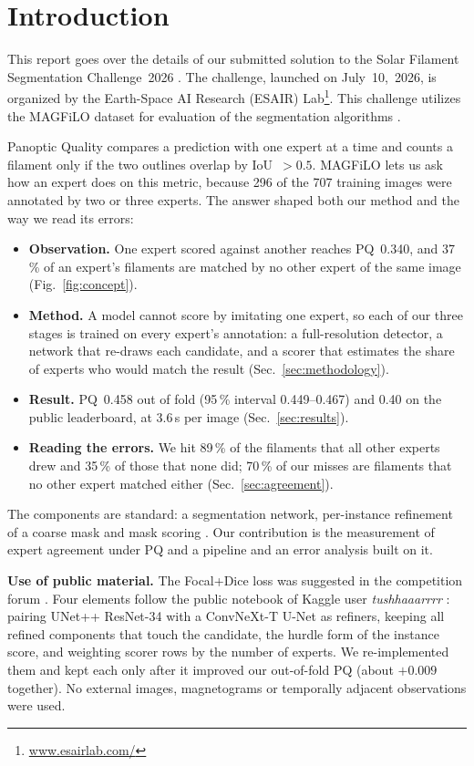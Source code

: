 \documentclass[sigconf]{acmart}
\begin{document}
\section{Introduction}
    This report goes over the details of our submitted solution to the Solar Filament Segmentation Challenge~2026 \cite{filament-segmentation-2026}. The challenge, launched on July~10,~2026, is organized by the Earth-Space AI Research (ESAIR) Lab\footnote{\href{https://www.esairlab.com/home}{www.esairlab.com/}}. This challenge utilizes the MAGFiLO dataset for evaluation of the segmentation algorithms \cite{ahmadzadeh2024dataset}.

    Panoptic Quality \cite{kirillov2019panoptic} compares a prediction with one expert at a time and counts a filament only if the two outlines overlap by IoU~$>0.5$.
    MAGFiLO lets us ask how an expert does on this metric, because 296 of the 707 training images were annotated by two or three experts. The answer shaped both our method and the way we read its errors:
    \begin{itemize}
        \item \textbf{Observation.} One expert scored against another reaches PQ~0.340, and 37\,\% of an expert's filaments are matched by no other expert of the same image (Fig.~\ref{fig:concept}).
        \item \textbf{Method.} A model cannot score by imitating one expert, so each of our three stages is trained on every expert's annotation: a full-resolution detector, a network that re-draws each candidate, and a scorer that estimates the share of experts who would match the result (Sec.~\ref{sec:methodology}).
        \item \textbf{Result.} PQ~0.458 out of fold (95\,\% interval 0.449--0.467) and 0.40 on the public leaderboard, at 3.6\,s per image (Sec.~\ref{sec:results}).
        \item \textbf{Reading the errors.} We hit 89\,\% of the filaments that all other experts drew and 35\,\% of those that none did; 70\,\% of our misses are filaments that no other expert matched either (Sec.~\ref{sec:agreement}).
    \end{itemize}
    The components are standard: a segmentation network, per-instance refinement of a coarse mask \cite{cai2018cascade,kirillov2020pointrend} and mask scoring \cite{huang2019msrcnn}. Our contribution is the measurement of expert agreement under PQ and a pipeline and an error analysis built on it.

    \textbf{Use of public material.}
    The Focal+Dice loss was suggested in the competition forum \cite{filament-segmentation-2026}.
    Four elements follow the public notebook of Kaggle user \emph{tushhaaarrrr} \cite{tushhaaarrrr2026filseg}: pairing UNet++ ResNet-34 with a ConvNeXt-T U-Net as refiners, keeping all refined components that touch the candidate, the hurdle form of the instance score, and weighting scorer rows by the number of experts.
    We re-implemented them and kept each only after it improved our out-of-fold PQ (about $+0.009$ together).
    No external images, magnetograms or temporally adjacent observations were used.
\end{document}
